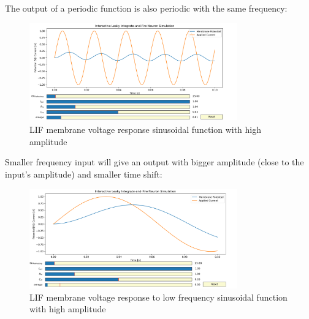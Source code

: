 The output of a periodic function is also periodic with the same frequency:

\begin{figure}[H]
    \centering
    \includegraphics[width=0.8\textwidth]{methods/computational-models/graphs/LIF-med-freq-sin-response.png}
    \caption{LIF membrane voltage response sinusoidal function with high amplitude}
    \label{fig:LIF-med-freq-sin}
\end{figure}

Smaller frequency input will give an output with bigger amplitude (close to the input’s amplitude) and smaller time shift:

\begin{figure}[H]
    \centering
    \includegraphics[width=0.8\textwidth]{methods/computational-models/graphs/LIF-low-freq-sin-response.png}
    \caption{LIF membrane voltage response to low frequency sinusoidal function with high amplitude}
    \label{fig:LIF-low-freq-sin}
\end{figure}